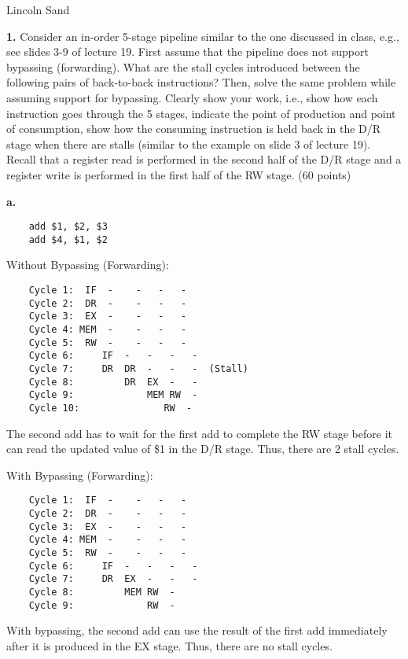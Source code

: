 \documentclass{article}
\begin{document}
\Large{Lincoln Sand}


\textbf{1.} Consider an in-order 5-stage pipeline similar to the one discussed in class, e.g.,
see slides 3-9 of lecture 19. First assume that the pipeline does not support bypassing (forwarding).
What are the stall cycles introduced between the following pairs of back-to-back instructions? Then,
solve the same problem while assuming support for bypassing. Clearly show your work, i.e., show how
each instruction goes through the 5 stages, indicate the point of production and point of consumption,
show how the consuming instruction is held back in the D/R stage when there are stalls (similar to the
example on slide 3 of lecture 19). Recall that a register read is performed in the second half of the
D/R stage and a register write is performed in the first half of the RW stage. (60 points)

\textbf{a.}

\begin{verbatim}
    add $1, $2, $3
    add $4, $1, $2
\end{verbatim}

Without Bypassing (Forwarding):

\begin{verbatim}
    Cycle 1:  IF  -    -   -   -  
    Cycle 2:  DR  -    -   -   -  
    Cycle 3:  EX  -    -   -   -  
    Cycle 4: MEM  -    -   -   -  
    Cycle 5:  RW  -    -   -   -  
    Cycle 6:     IF  -   -   -   -  
    Cycle 7:     DR  DR  -   -   -  (Stall)
    Cycle 8:         DR  EX  -   -  
    Cycle 9:             MEM RW  -  
    Cycle 10:               RW  -  
\end{verbatim}

The second add has to wait for the first add to complete the RW stage before it can read the
updated value of \$1 in the D/R stage. Thus, there are 2 stall cycles.

With Bypassing (Forwarding):

\begin{verbatim}
    Cycle 1:  IF  -    -   -   -  
    Cycle 2:  DR  -    -   -   -  
    Cycle 3:  EX  -    -   -   -  
    Cycle 4: MEM  -    -   -   -  
    Cycle 5:  RW  -    -   -   -  
    Cycle 6:     IF  -   -   -   -  
    Cycle 7:     DR  EX  -   -   -  
    Cycle 8:         MEM RW  -  
    Cycle 9:             RW  -  
\end{verbatim}

With bypassing, the second add can use the result of the first add immediately after it is
produced in the EX stage. Thus, there are no stall cycles.
\end{document}
